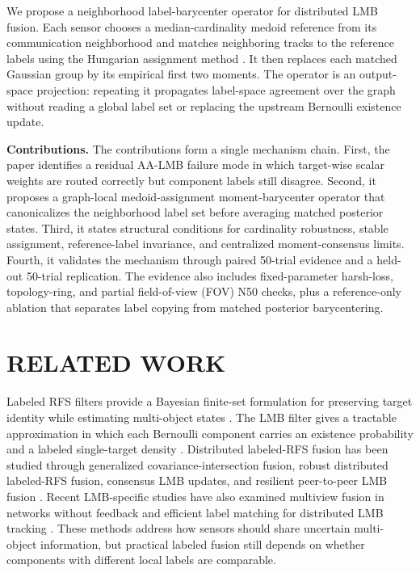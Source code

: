 \documentclass{IEEEtaes}
\newcommand{\method}{neighborhood label-barycenter}
\begin{document}
We propose a \method{} operator for distributed LMB fusion. Each sensor chooses a median-cardinality medoid reference from its communication neighborhood and matches neighboring tracks to the reference labels using the Hungarian assignment method \cite{Kuhn1955Hungarian}. It then replaces each matched Gaussian group by its empirical first two moments. The operator is an output-space projection: repeating it propagates label-space agreement over the graph without reading a global label set or replacing the upstream Bernoulli existence update.

\noindent\textbf{Contributions.}
The contributions form a single mechanism chain. First, the paper identifies a residual AA-LMB failure mode in which target-wise scalar weights are routed correctly but component labels still disagree. Second, it proposes a graph-local medoid-assignment moment-barycenter operator that canonicalizes the neighborhood label set before averaging matched posterior states. Third, it states structural conditions for cardinality robustness, stable assignment, reference-label invariance, and centralized moment-consensus limits. Fourth, it validates the mechanism through paired 50-trial evidence and a held-out 50-trial replication. The evidence also includes fixed-parameter harsh-loss, topology-ring, and partial field-of-view (FOV) N50 checks, plus a reference-only ablation that separates label copying from matched posterior barycentering.

\section{RELATED WORK}
Labeled RFS filters provide a Bayesian finite-set formulation for preserving target identity while estimating multi-object states \cite{Vo2014LRFS}. The LMB filter gives a tractable approximation in which each Bernoulli component carries an existence probability and a labeled single-target density \cite{Reuter2014LMB}. Distributed labeled-RFS fusion has been studied through generalized covariance-intersection fusion, robust distributed labeled-RFS fusion, consensus LMB updates, and resilient peer-to-peer LMB fusion \cite{Wang2017MBGCI,Li2018RobustDistributedLRFS,Shen2022ConsensusLMB,Gao2023ResilientLMB}. Recent LMB-specific studies have also examined multiview fusion in networks without feedback and efficient label matching for distributed LMB tracking \cite{Jin2023MultiviewLMB,Ding2025EfficientLabelMatching}. These methods address how sensors should share uncertain multi-object information, but practical labeled fusion still depends on whether components with different local labels are comparable.
\end{document}
